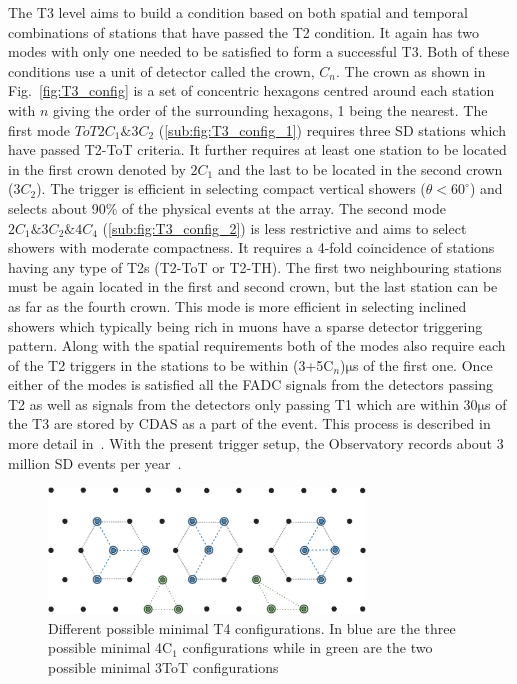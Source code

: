 The T3 level aims to build a condition based on both spatial and temporal combinations of stations that have passed the T2 condition. It again has two modes with only one needed to be satisfied to form a successful T3. Both of these conditions use a unit of detector called the crown, $C_n$. The crown as shown in Fig.~\ref{fig:T3_config} is a set of concentric hexagons centred around each station with $n$ giving the order of the surrounding hexagons, 1 being the nearest. The first mode $ToT2C_1\&3C_2$ (\ref{sub:fig:T3_config_1}) requires three SD stations which have passed T2-ToT criteria. It further requires at least one station to be located in the first crown denoted by $2C_1$ and the last to be located in the second crown ($3C_2$). The trigger is efficient in selecting compact vertical showers ($\theta < 60^{\circ}$) and selects about 90\% of the physical events at the array. The second mode $2C_1\&3C_2\&4C_4$ (\ref{sub:fig:T3_config_2}) is less restrictive and aims to select showers with moderate compactness. It requires a 4-fold coincidence of stations having any type of T2s (T2-ToT or T2-TH). The first two neighbouring stations must be again located in the first and second crown, but the last station can be as far as the fourth crown. This mode is more efficient in selecting inclined showers which typically being rich in muons have a sparse detector triggering pattern. Along with the spatial requirements both of the modes also require each of the T2 triggers in the stations to be within (3+5C$_n$)$\mathrm{\mu}$s of the first one. Once either of the modes is satisfied all the FADC signals from the detectors passing T2 as well as signals from the detectors only passing T1 which are within 30$\mathrm{\mu}$s of the T3 are stored by CDAS as a part of the event. This process is described in more detail in~\cite{Auger:2015}. With the present trigger setup, the Observatory records about 3 million SD events per year~\cite{Auger:2015}. 


\begin{figure}[t!]
  \centering
  \includegraphics[width=0.75\textwidth]{thesis_figures/Setup/T4_modes.png}
  \caption{Different possible minimal T4 configurations. In blue are the three possible minimal 4C$_1$ configurations while in green are the two possible minimal 3ToT configurations}
  \label{fig:T4_config}
\end{figure}




